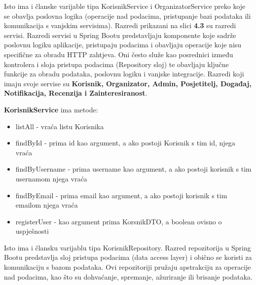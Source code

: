 			Isto ima i članske varijable tipa KorisnikService i OrganizatorService preko koje se obavlja poslovna logika (operacije nad podacima, pristupanje bazi podataka ili komunikacija s vanjskim servisima).
			\newline
			\newline
			Razredi prikazani na slici \textbf{4.3} su razredi servisi. Razredi servisi u Spring Bootu predstavljaju komponente koje sadrže poslovnu logiku aplikacije, pristupaju podacima i obavljaju operacije koje nisu specifične za obradu HTTP zahtjeva. Oni često služe kao posrednici između kontrolera i sloja pristupa podacima (Repository sloj) te obavljaju ključne funkcije za obradu podataka, poslovnu logiku i vanjske integracije.
			Razredi koji imaju svoje servise su \textbf{Korisnik, Organizator, Admin, Posjetitelj, Događaj, Notifikacija, Recenzija i Zainteresiranost}.
			\newline
			
			\textbf{KorisnikService} ima metode: 
			\begin{itemize}
				\item listAll - vraća listu Korisnika
				\item findById - prima id kao argument, a ako postoji Korisnik s tim id, njega vraća
				\item findByUsername - prima username kao argument, a ako postoji korisnik s tim usernamom njega vraća
				\item findByEmail - prima email kao argument, a ako postoji korisnik s tim emailom njega vraća
				\item registerUser - kao argument prima KorsnikDTO, a boolean ovisno o uspješnosti
			\end{itemize}
			
			Isto ima i člansku varijablu tipa KorisnikRepository. Razred repozitorija u Spring Bootu predstavlja sloj pristupa podacima (data access layer) i obično se koristi za komunikaciju s bazom podataka. Ovi repozitoriji pružaju apstrakciju za operacije nad podacima, kao što su dohvaćanje, spremanje, ažuriranje ili brisanje podataka.
			\newline
			
